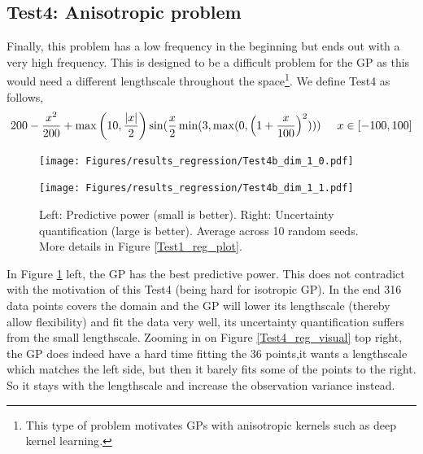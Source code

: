 \subsection{Test4: Anisotropic problem}
Finally, this problem has a low frequency in the beginning but ends out with a very high frequency.
This is designed to be a difficult problem for the GP as this would need a different lengthscale
throughout the space\footnote{This type of problem motivates GPs with anisotropic kernels such as deep
kernel learning\cite{DeepKernelLearning}.}. We define Test4 as follows, 
$$200 - \frac{x^2}{200} + \max\left(10, \frac{|x|}{2}\right) \sin(\frac{x}{2} \min(3, \max(0, \left(1 + \frac{x}{100}\right)^2))) \hspace{0.5cm} x \in [-100,100]$$

\begin{figure}[H]
  \centering
  \begin{minipage}[b]{0.49\textwidth}
   \texttt{[image: Figures/results\_regression/Test4b\_dim\_1\_0.pdf]}
  \end{minipage}
  \hfill
  \begin{minipage}[b]{0.49\textwidth}
    \texttt{[image: Figures/results\_regression/Test4b\_dim\_1\_1.pdf]}
   \end{minipage}
  \caption{Left: Predictive power (small is better). Right: Uncertainty quantification (large is
  better). Average across 10 random seeds. More details in Figure \ref{Test1_reg_plot}.}
  \label{Test4_reg_plot}
\end{figure}

In Figure \ref{Test4_reg_plot} left, the GP has the best predictive power. This does not contradict
with the motivation of this Test4 (being hard for isotropic GP). In the end 316 data points covers
the domain and the GP will lower its lengthscale (thereby allow flexibility) and fit the data very
well, its uncertainty quantification suffers from the small lengthscale. %
Zooming in on Figure \ref{Test4_reg_visual} top right, the GP does indeed have a hard
time fitting the 36 points,it wants a lengthscale which matches the left side, but then it barely
fits some of the points to the right. So it stays with the lengthscale and increase the observation
variance instead. 



